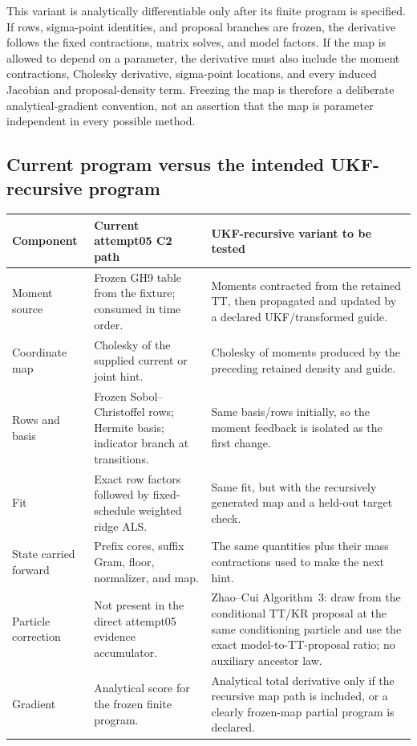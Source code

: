\documentclass[11pt]{article}
\begin{document}
This variant is analytically differentiable only after its finite program is
specified.  If rows, sigma-point identities, and proposal branches are frozen,
the derivative follows the fixed contractions, matrix solves, and model
factors.  If the map is allowed to depend on a parameter, the derivative must
also include the moment contractions, Cholesky derivative, sigma-point
locations, and every induced Jacobian and proposal-density term.  Freezing the
map is therefore a deliberate analytical-gradient convention, not an
assertion that the map is parameter independent in every possible method.

\subsection{Current program versus the intended UKF-recursive program}

\begin{center}
\begin{tabular}{p{}p{}p{}}
\toprule
Component & Current attempt05 C2 path & UKF-recursive variant to be tested\\
\midrule
Moment source & Frozen GH9 table from the fixture; consumed in time order. & Moments contracted from the retained TT, then propagated and updated by a declared UKF/transformed guide.\\
Coordinate map & Cholesky of the supplied current or joint hint. & Cholesky of moments produced by the preceding retained density and guide.\\
Rows and basis & Frozen Sobol--Christoffel rows; Hermite basis; indicator branch at transitions. & Same basis/rows initially, so the moment feedback is isolated as the first change.\\
Fit & Exact row factors followed by fixed-schedule weighted ridge ALS. & Same fit, but with the recursively generated map and a held-out target check.\\
State carried forward & Prefix cores, suffix Gram, floor, normalizer, and map. & The same quantities plus their mass contractions used to make the next hint.\\
Particle correction & Not present in the direct attempt05 evidence accumulator. & Zhao--Cui Algorithm~3: draw from the conditional TT/KR proposal at the same conditioning particle and use the exact model-to-TT-proposal ratio; no auxiliary ancestor law.\\
Gradient & Analytical score for the frozen finite program. & Analytical total derivative only if the recursive map path is included, or a clearly frozen-map partial program is declared.\\
\bottomrule
\end{tabular}
\end{center}
\end{document}
